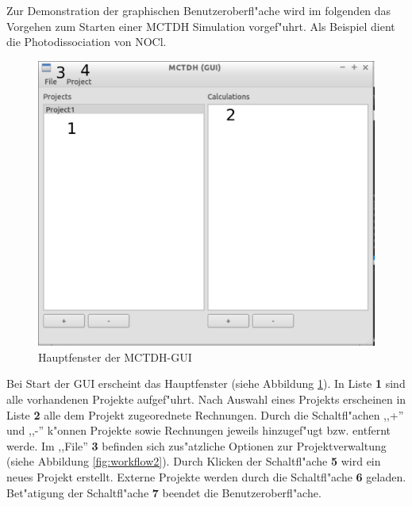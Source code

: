Zur Demonstration der graphischen Benutzeroberfl"ache wird im folgenden das Vorgehen zum Starten einer 
MCTDH Simulation vorgef"uhrt. Als Beispiel dient die Photodissociation von NOCl.

\begin{figure}
    \centering
    \includegraphics[scale=0.5]{figures/screenMain}
    \caption{Hauptfenster der MCTDH-GUI}\label{fig:workflow1}
\end{figure}

Bei Start der GUI erscheint das Hauptfenster (siehe Abbildung \ref{fig:workflow1}).
In Liste \textbf{1} sind alle vorhandenen Projekte aufgef"uhrt.
Nach Auswahl eines Projekts erscheinen in Liste \textbf{2} alle dem Projekt zugeorednete Rechnungen.
Durch die Schaltfl"achen ,,+'' und ,,-'' k"onnen Projekte sowie Rechnungen jeweils hinzugef"ugt bzw.
entfernt werde.
Im ,,File'' \textbf{3} befinden sich zus"atzliche Optionen zur Projektverwaltung (siehe Abbildung \ref{fig:workflow2}).
Durch Klicken der Schaltfl"ache \textbf{5} wird ein neues Projekt erstellt. Externe Projekte werden durch die 
Schaltfl"ache \textbf{6} geladen. Bet"atigung der Schaltfl"ache \textbf{7} beendet die Benutzeroberfl"ache.

